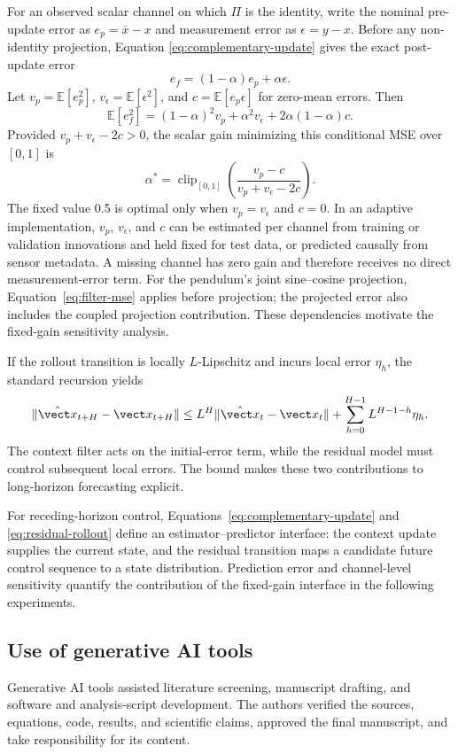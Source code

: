 For an observed scalar channel on which $\Pi$ is the identity, write the
nominal pre-update error as $e_p=\bar x-x$ and measurement error as
$\epsilon=y-x$. Before any non-identity projection, Equation
\eqref{eq:complementary-update} gives the exact post-update error
\begin{equation}
 e_f=(1-\alpha)e_p+\alpha\epsilon.
\end{equation}
Let $v_p=\mathbb E[e_p^2]$, $v_\epsilon=\mathbb E[\epsilon^2]$, and
$c=\mathbb E[e_p\epsilon]$ for zero-mean errors. Then
\begin{equation}
 \mathbb E[e_f^2]=(1-\alpha)^2v_p+\alpha^2v_\epsilon
 +2\alpha(1-\alpha)c.
 \label{eq:filter-mse}
\end{equation}
Provided $v_p+v_\epsilon-2c>0$, the scalar gain minimizing this conditional MSE
over $[0,1]$ is
\begin{equation}
 \alpha^*=\operatorname{clip}_{[0,1]}
 \left(\frac{v_p-c}{v_p+v_\epsilon-2c}\right).
 \label{eq:optimal-gain}
\end{equation}
The fixed value 0.5 is optimal only when $v_p=v_\epsilon$ and $c=0$. In an
adaptive implementation, $v_p$, $v_\epsilon$, and $c$ can be estimated per
channel from training or validation innovations and held fixed for test data,
or predicted causally from sensor metadata. A missing channel has zero gain and
therefore receives no direct measurement-error term. For the pendulum's joint sine--cosine projection,
Equation~\eqref{eq:filter-mse} applies before projection; the projected error
also includes the coupled projection contribution. These dependencies motivate
the fixed-gain sensitivity analysis.

If the rollout transition is locally $L$-Lipschitz and incurs local error
$\eta_h$, the standard recursion yields
\begin{equation}
 \|\hat{\vect x}_{t+H}-\vect x_{t+H}\|
 \le L^H\|\hat{\vect x}_t-\vect x_t\|
 +\sum_{h=0}^{H-1}L^{H-1-h}\eta_h.
\end{equation}
The context filter acts on the initial-error term, while the residual model
must control subsequent local errors. The bound makes these two contributions
to long-horizon forecasting explicit.

For receding-horizon control, Equations~\eqref{eq:complementary-update} and
\eqref{eq:residual-rollout} define an estimator--predictor interface: the
context update supplies the current state, and the residual transition maps a
candidate future control sequence to a state distribution. Prediction error
and channel-level sensitivity quantify the contribution of the fixed-gain
interface in the following experiments.

\subsection{Use of generative AI tools}

Generative AI tools assisted literature screening, manuscript drafting, and
software and analysis-script development. The authors verified the sources,
equations, code, results, and scientific claims, approved the final manuscript,
and take responsibility for its content.
